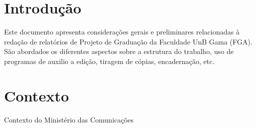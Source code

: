 \chapter[Introdução]{Introdução}

Este documento apresenta considerações gerais e preliminares relacionadas
à redação de relatórios de Projeto de Graduação da Faculdade UnB Gama
(FGA). São abordados os diferentes aspectos sobre a estrutura do trabalho,
uso de programas de auxilio a edição, tiragem de cópias, encadernação, etc.

\chapter[Contexto]{Contexto}

Contexto do Ministério das Comunicações

